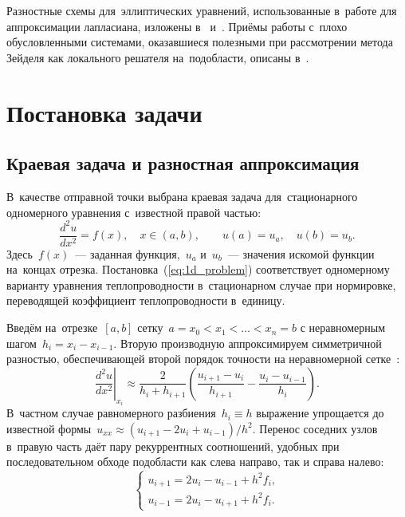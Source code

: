 Разностные схемы для~эллиптических уравнений, использованные в~работе для
аппроксимации лапласиана, изложены в~\cite{samarskii1989} и~\cite{bahvalov2003}.
Приёмы работы с~плохо обусловленными системами, оказавшиеся полезными при
рассмотрении метода Зейделя как локального решателя на~подобласти, описаны
в~\cite{golub1999}.

\section{Постановка задачи}

\subsection{Краевая задача и разностная аппроксимация}

В~качестве отправной точки выбрана краевая задача для~стационарного
одномерного уравнения с~известной правой частью:
\begin{equation}\label{eq:1d_problem}
	\frac{d^2 u}{d x^2} = f(x),\quad x\in(a,b),
	\qquad u(a)=u_a,\quad u(b)=u_b.
\end{equation}
Здесь~$f(x)$~--- заданная функция,~$u_a$ и~$u_b$~--- значения искомой функции
на~концах отрезка. Постановка~(\ref{eq:1d_problem}) соответствует
одномерному варианту уравнения теплопроводности в~стационарном случае при
нормировке, переводящей коэффициент теплопроводности в~единицу.

Введём на~отрезке~$[a,b]$ сетку~$a=x_0<x_1<\dots<x_n=b$ с
неравномерным шагом~$h_i=x_i-x_{i-1}$. Вторую производную аппроксимируем
симметричной разностью, обеспечивающей второй порядок точности на
неравномерной сетке~\cite{samarskii1989}:
\begin{equation}\label{eq:central_diff}
	\left.\frac{d^2 u}{d x^2}\right|_{x_i}
	\approx \frac{2}{h_i + h_{i+1}}
	\left(\frac{u_{i+1}-u_i}{h_{i+1}} - \frac{u_i-u_{i-1}}{h_i}\right).
\end{equation}
В~частном случае равномерного разбиения~$h_i\equiv h$ выражение упрощается до
известной формы~$u_{xx}\approx (u_{i+1}-2u_i+u_{i-1})/h^2$. Перенос соседних
узлов в~правую часть даёт пару рекуррентных соотношений, удобных при
последовательном обходе подобласти как слева направо, так и справа налево:
\begin{equation}\label{eq:recur}
	\begin{cases}
		u_{i+1} = 2u_i - u_{i-1} + h^2 f_i, \\[8pt]
		u_{i-1} = 2u_i - u_{i+1} + h^2 f_i.
	\end{cases}
\end{equation}

